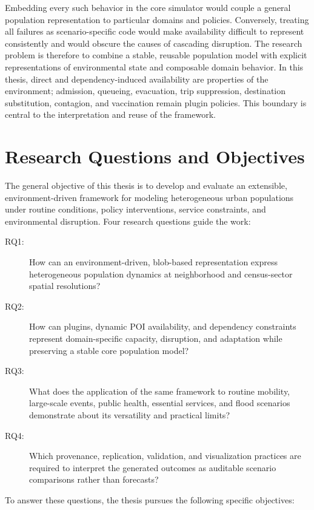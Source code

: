 Embedding every such behavior in the core simulator would couple a general population representation to particular domains and policies. Conversely, treating all failures as scenario-specific code would make availability difficult to represent consistently and would obscure the causes of cascading disruption. The research problem is therefore to combine a stable, reusable population model with explicit representations of environmental state and composable domain behavior. In this thesis, direct and dependency-induced availability are properties of the environment; admission, queueing, evacuation, trip suppression, destination substitution, contagion, and vaccination remain plugin policies. This boundary is central to the interpretation and reuse of the framework.

\section{Research Questions and Objectives}
\label{sec:introduction_questions}

The general objective of this thesis is to develop and evaluate an extensible, environment-driven framework for modeling heterogeneous urban populations under routine conditions, policy interventions, service constraints, and environmental disruption. Four research questions guide the work:

\begin{description}
    \item[RQ1:] How can an environment-driven, blob-based representation express heterogeneous population dynamics at neighborhood and census-sector spatial resolutions?
    \item[RQ2:] How can plugins, dynamic POI availability, and dependency constraints represent domain-specific capacity, disruption, and adaptation while preserving a stable core population model?
    \item[RQ3:] What does the application of the same framework to routine mobility, large-scale events, public health, essential services, and flood scenarios demonstrate about its versatility and practical limits?
    \item[RQ4:] Which provenance, replication, validation, and visualization practices are required to interpret the generated outcomes as auditable scenario comparisons rather than forecasts?
\end{description}

To answer these questions, the thesis pursues the following specific objectives:

